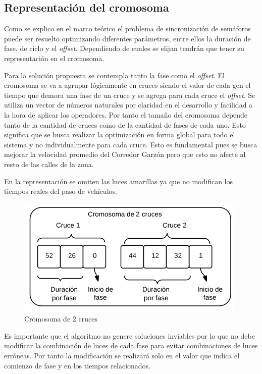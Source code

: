 \subsection{Representación del cromosoma}

Como se explico en el marco teórico el problema de sincronización de semáforos puede ser resuelto optimizando diferentes parámetros, entre ellos la duración de fase, de ciclo y el \emph{offset}. Dependiendo de cuales se elijan tendrán que tener su representación en el cromosoma.

Para la solución propuesta se contempla tanto la fase como el \emph{offset}. El cromosoma se va a  agrupar  lógicamente en cruces siendo el valor de cada gen el tiempo que demora una
fase de un cruce y se agrega para cada cruce el \emph{offset}. Se utiliza un vector de números naturales por claridad en el desarrollo y facilidad a la hora de aplicar los operadores.
Por tanto el tamaño del cromosoma depende tanto de la cantidad de cruces como de la cantidad de fases de cada uno. Esto significa que se busca realizar la optimización en forma global para todo el sistema y no individualmente para cada cruce. Esto es fundamental pues se busca mejorar la velocidad promedio del Corredor Garzón pero que esto no afecte al resto de las calles de la zona.

En la representación se omiten las luces amarillas ya que no modifican los tiempos reales del paso de vehículos.
 
 \begin{figure}[h]
 	\centering
 	\includegraphics[width=0.7\linewidth]{Figures/cromosoma1}
 	\caption{Cromosoma de 2 cruces}
 	\label{fig:cromosoma1}
 \end{figure}
 
Es  importante que el algoritmo no genere soluciones inviables por lo que no debe modificar la combinación de luces de cada fase para evitar combinaciones de luces erróneas. Por tanto la modificación se realizará solo en el valor que indica el comienzo de fase y en los tiempos relacionados.

